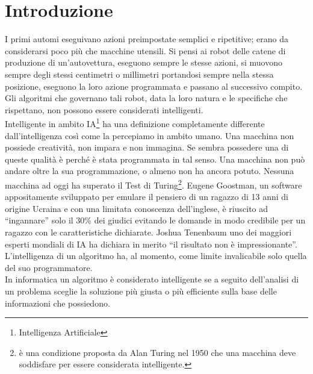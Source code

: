 \chapter*{Introduzione}
\fancyfoot[C]{\thepage } 
I primi automi eseguivano azioni preimpostate semplici e ripetitive; erano da considerarsi poco 
più che macchine utensili. Si pensi ai robot delle catene di produzione di un'autovettura, 
eseguono sempre le stesse azioni, si muovono sempre degli stessi centimetri o millimetri 
portandosi sempre nella stessa posizione, eseguono la loro azione programmata 
e passano al successivo compito. Gli algoritmi che governano tali robot, data la 
loro natura e le specifiche che rispettano, non possono essere considerati intelligenti.\\
Intelligente in ambito IA\footnote{Intelligenza Artificiale} ha una definizione completamente differente 
dall'intelligenza così come la percepiamo in ambito umano. Una macchina non 
possiede creatività, non impara e non immagina. Se sembra possedere una di queste 
qualità è perché è stata programmata in tal senso. Una macchina non può andare oltre 
la sua programmazione, o almeno non ha ancora potuto. Nessuna macchina ad oggi ha superato 
il Test di Turing\footnote{è una condizione proposta da Alan Turing nel 1950 
che una macchina deve soddisfare per essere considerata intelligente.}. Eugene 
Goostman, un software appositamente sviluppato per emulare il pensiero 
di un ragazzo di 13 anni di origine Ucraina e con una limitata conoscenza dell'inglese,
è riuscito ad ``ingannare'' solo il 30\% dei giudici evitando le domande in modo 
credibile per un ragazzo con le caratteristiche dichiarate. Joshua Tenenbaum uno dei 
maggiori esperti mondiali di IA ha dichiara in merito ``il risultato non è impressionante''.
L'intelligenza di un algoritmo ha, al momento, come limite invalicabile solo quella 
del suo programmatore.\\
In informatica un algoritmo è considerato intelligente
se a seguito dell'analisi di un problema sceglie la soluzione più giusta o più efficiente 
sulla base delle informazioni che possiedono.

